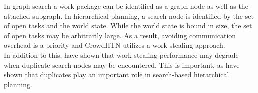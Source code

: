 In graph search a work package can be identified as a graph node as well as the attached subgraph. In hierarchical planning, a search node is identified by the set of open tasks and the world state. While the world state is bound in size, the set of open tasks may be arbitrarily large. As a result, avoiding communication overhead is a priority and CrowdHTN utilizes a work stealing approach. \\
In addition to this, \cite{fukunaga2018parallel} have shown that work stealing performance may degrade when duplicate search nodes may be encountered. This is important, as \cite{holler2021loop} have shown that duplicates play an important role in search-based hierarchical planning.
\begin{comment}
- many hierarchical planners such as HyperTensioN \cite{magnaguagno2020hypertension}, PANDA \cite{holler2020htn} and our own planner CrowdHTN \cite{bretl2021parallel} are based on some form of DFS
- parallel DFS has been investigated for over 30 years \cite{rao1987parallel, kumar1987parallel}
- in hierarchical planning our graph is often so large as to be only implicitly defined
- load balancing under these conditions was investigated by \cite{sanders1997lastverteilungsalgorithmen}

- load balancing is important, parallelism can lead to overhead \cite{fukunaga2018parallel}
- search overhead: parallel implementation expands more nodes than a sequential one
- synchronization overhead: processors are waiting for synchronization points
- communication overhead: time spent on communication
- work sharing:
- processors with work actively distribute it to processors without work
- work stealing:
- processors without work "steal" work from processors with work
- important: where do you get work from/ give it to? Randomization!
- work stealing has less communication overhead than work sharing \cite{blumofe1999scheduling}

- work package: a node in our graph and all it's children
- TOHTN planning this is large, as the task network may get very big
- our own planner CrowdHTN uses work randomized stealing
- work stealing performance may degrade where duplicate states play a role \cite{fukunaga2018parallel}
- \cite{holler2021loop} shows duplicates are important in TOHTN planning
\end{comment}

